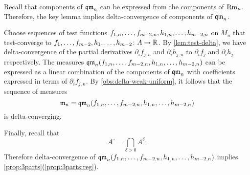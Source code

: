 Recall that components of $\operatorname{\mathfrak{qm}}_n$ can be expressed from the components of $\operatorname{\rm Rm}_n$.
Therefore, the key lemma implies delta-convergence of components of $\operatorname{\mathfrak{qm}}_n$.

Choose sequences of test functions $f_{1,n},\dots,f_{m-2,n},h_{1,n},\zz\dots,h_{m-2,n}$ on $M_n$ that test-converge to $f_{1},\dots,f_{m-2},h_{1},\dots,h_{m-2}\colon A\to \mathbb{R}$.
By \ref{lem:test-delta}, we have delta-convergence of the partial derivatives $\partial_if_{j,n}$ and 
$\partial_ih_{j,n}$ to $\partial_if_{j}$ and 
$\partial_ih_{j}$ respectively.
The measures $\qm_n(f_{1,n},\dots,f_{m-2,n},h_{1,n},\zz\dots,h_{m-2,n})$ 
can be expressed as a linear combination of the components of $\operatorname{\mathfrak{qm}}_n$ with coefficients expressed in terms of $\partial_if_{j,n}$.
By \ref{obs:delta-weak-uniform}, it follows that the sequence of measures 
\[\mathfrak m_n=\qm_n(f_{1,n},\dots,f_{m-2,n},h_{1,n},\zz\dots,h_{m-2,n})\]
is delta-converging.

Finally, recall that 
\[A^\circ=\bigcap_{\delta>0}A^\delta.\]
Therefore delta-convergence of $\qm_n(f_{1,n},\dots,f_{m-2,n},h_{1,n},\zz\dots,h_{m-2,n})$ implies \ref{prop:3parts}(\ref{prop:3parts:reg}).
\qeds
